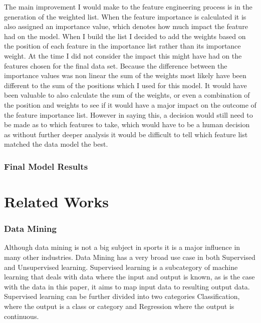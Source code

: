 \documentclass{imc-inf}
\begin{document}
	The main improvement I would make to the feature engineering process is in the generation of the weighted list. When the feature importance is calculated it is also assigned an importance value, which denotes how much impact the feature had on the model. When I build the list I decided to add the weights based on the position of each feature in the importance list rather than its importance weight. At the time I did not consider the impact this might have had on the features chosen for the final data set. Because the difference between the importance values was non linear the sum of the weights most likely have been different to the sum of the positions which I used for this model. It would have been valuable to also calculate the sum of the weights, or even a combination of the position and weights to see if it would have a major impact on the outcome of the feature importance list. However in saying this, a decision would still need to be made as to which features to take, which would have to be a human decision as without further deeper analysis it would be difficult to tell which feature list matched the data model the best.
	
	
	\subsection{Final Model Results}
	
	\chapter{Related Works}\label{chap:related_works}
	\subsection{Data Mining}
	Although data mining is not a big subject in sports it is a major influence in many other industries. Data Mining has a very broad use case in both Supervised and Unsupervised learning. Supervised learning is a subcategory of machine learning that deals with data where the input and output is known, as is the case with the data in this paper, it aims to map input data to resulting output data. Supervised learning can be further divided into two categories Classification, where the output is a class or category and Regression where the output is continuous. 
	
\end{document}
